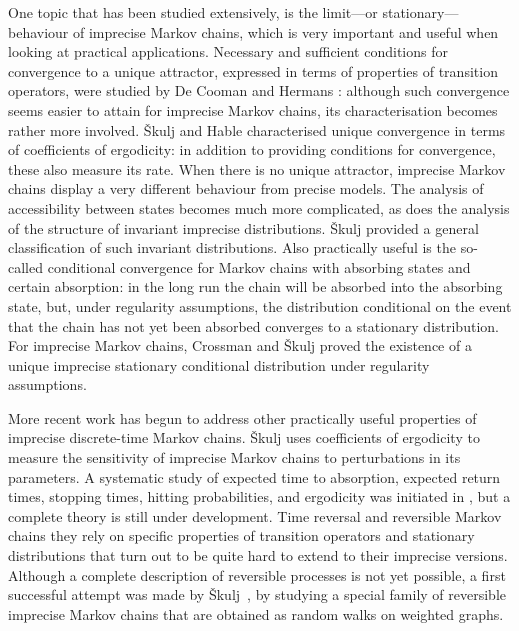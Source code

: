 \documentclass[11pt,dvipsnames,usenames,a4paper]{article}
\begin{document}
One topic that has been studied extensively, is the limit---or stationary---behaviour of imprecise Markov chains, which is very important and useful when looking at practical applications.
Necessary and sufficient conditions for convergence to a unique attractor, expressed in terms of properties of transition operators, were studied by De Cooman and Hermans \cite{cooman2008,hermans2012}: although such convergence seems easier to attain for imprecise Markov chains, its characterisation becomes rather more involved.
Škulj and Hable \cite{skulj2013} characterised unique convergence in terms of coefficients of ergodicity: in addition to providing conditions for convergence, these also measure its rate. 
When there is no unique attractor, imprecise Markov chains display a very different behaviour from precise models. 
The analysis of accessibility between states becomes much more complicated, as does the analysis of the structure of invariant imprecise distributions. 
Škulj \cite{skulj:13b} provided a general classification of such invariant distributions. Also practically useful is the so-called conditional convergence for Markov chains with absorbing states and certain absorption: in the long run the chain will be absorbed into the absorbing state, but, under regularity assumptions, the distribution conditional on the event that the chain has not yet been absorbed converges to a stationary distribution. 
For imprecise Markov chains, Crossman and Škulj \cite{Crossman:2010} proved the existence of a unique imprecise stationary conditional distribution under regularity assumptions. 

More recent work has begun to address other practically useful properties of imprecise discrete-time Markov chains.
Škulj \cite{skulj:2016b} uses coefficients of ergodicity to measure the sensitivity of imprecise Markov chains to perturbations in its parameters. 
A systematic study of expected time to absorption, expected return times, stopping times, hitting  probabilities, and ergodicity was initiated in \cite{troffaes:2013, cooman2015:markovergodic}, but a complete theory is still under development. 
Time reversal and reversible Markov chains they rely on specific properties of transition operators and stationary distributions that turn out to be quite hard to extend to their imprecise versions. 
Although a complete description of reversible processes is not yet possible, a first successful attempt was made by Škulj~\cite{skulj:16}, by studying a special family of reversible imprecise Markov chains that are obtained as random walks on weighted graphs. 
\end{document}
